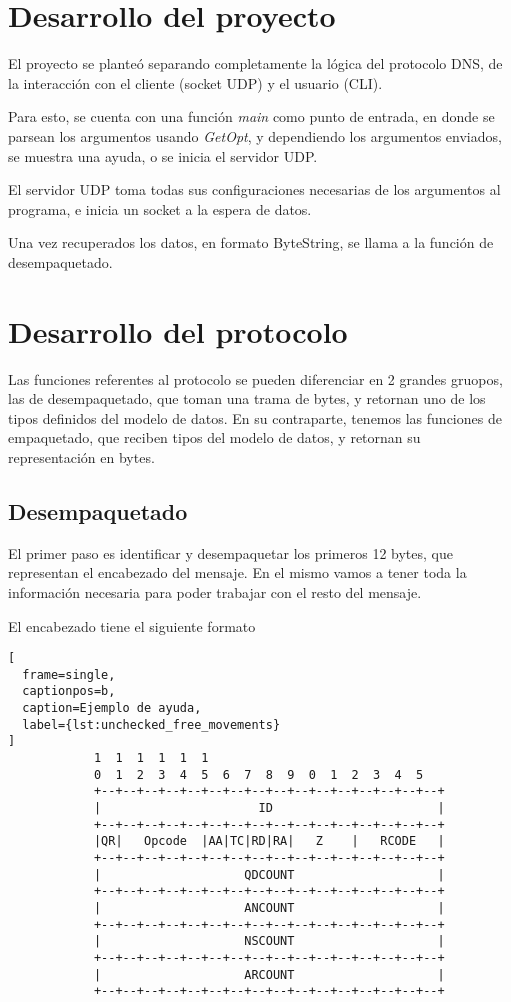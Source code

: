 \documentclass[6pt]{article}
\begin{document}
\section{Desarrollo del proyecto}

El proyecto se planteó separando completamente la lógica del protocolo
DNS, de la interacción con el cliente (socket UDP) y el usuario (CLI).

Para esto, se cuenta con una función \textit{main} como punto de entrada,
en donde se parsean los argumentos usando \textit{GetOpt}, y dependiendo
los argumentos enviados, se muestra una ayuda, o se inicia el servidor
UDP.

El servidor UDP toma todas sus configuraciones necesarias de los
argumentos al programa, e inicia un socket a la espera de datos.

Una vez recuperados los datos, en formato ByteString, se llama a la
función de desempaquetado.

\section{Desarrollo del protocolo}

Las funciones referentes al protocolo se pueden diferenciar en 2 grandes
gruopos, las de desempaquetado, que toman una trama de bytes, y retornan
uno de los tipos definidos del modelo de datos. En su contraparte, tenemos
las funciones de empaquetado, que reciben tipos del modelo de datos, y
retornan su representación en bytes.

\subsection{Desempaquetado}

El primer paso es identificar y desempaquetar los primeros
12 bytes, que representan el encabezado del mensaje. En el mismo vamos
a tener toda la información necesaria para poder trabajar con el resto
del mensaje.

El encabezado tiene el siguiente formato

\begin{lstlisting}[
  frame=single,
  captionpos=b,
  caption=Ejemplo de ayuda,
  label={lst:unchecked_free_movements}
]
            1  1  1  1  1  1
            0  1  2  3  4  5  6  7  8  9  0  1  2  3  4  5
            +--+--+--+--+--+--+--+--+--+--+--+--+--+--+--+--+
            |                      ID                       |
            +--+--+--+--+--+--+--+--+--+--+--+--+--+--+--+--+
            |QR|   Opcode  |AA|TC|RD|RA|   Z    |   RCODE   |
            +--+--+--+--+--+--+--+--+--+--+--+--+--+--+--+--+
            |                    QDCOUNT                    |
            +--+--+--+--+--+--+--+--+--+--+--+--+--+--+--+--+
            |                    ANCOUNT                    |
            +--+--+--+--+--+--+--+--+--+--+--+--+--+--+--+--+
            |                    NSCOUNT                    |
            +--+--+--+--+--+--+--+--+--+--+--+--+--+--+--+--+
            |                    ARCOUNT                    |
            +--+--+--+--+--+--+--+--+--+--+--+--+--+--+--+--+
\end{lstlisting}
\end{document}
